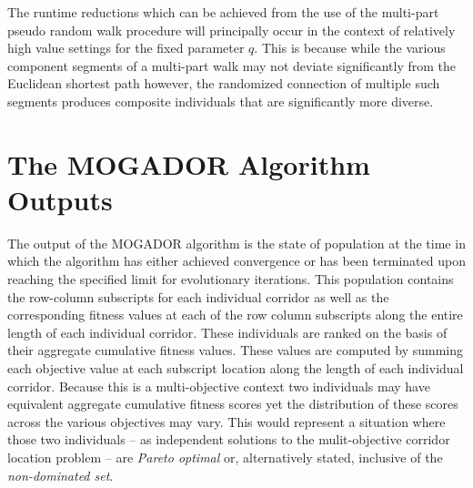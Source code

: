 The runtime reductions which can be achieved from the use of the multi-part pseudo random walk procedure will principally occur in the context of relatively high value settings for the fixed parameter $q$. This is because while the various component segments of a multi-part walk may not deviate significantly from the Euclidean shortest path however, the randomized connection of multiple such segments produces composite individuals that are significantly more diverse.
            
\section{The MOGADOR Algorithm Outputs}

The output of the MOGADOR algorithm is the state of population at the time in which the algorithm has either achieved convergence or has been terminated upon reaching the specified limit for evolutionary iterations. This population contains the row-column subscripts for each individual corridor as well as the corresponding fitness values at each of the row column subscripts along the entire length of each individual corridor. These individuals are ranked on the basis of their aggregate cumulative fitness values. These values are computed by summing each objective value at each subscript location along the length of each individual corridor. Because this is a multi-objective context two individuals may have equivalent aggregate cumulative fitness scores yet the distribution of these scores across the various objectives may vary. This would represent a situation where those two individuals -- as independent solutions to the mulit-objective corridor location problem -- are \textit{Pareto optimal} or, alternatively stated, inclusive of the \textit{non-dominated set}.

\clearpage
